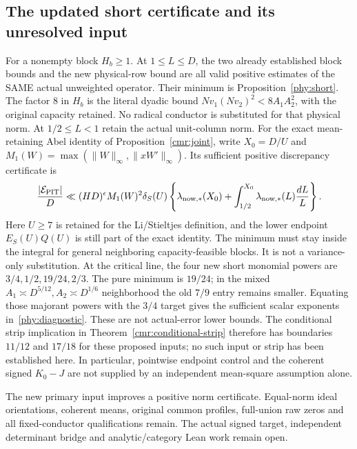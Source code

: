 \subsection{The updated short certificate and its unresolved input}\label{phy:short-proof}
For a nonempty block $H_b\ge1$. At $1\le L\le D$, the two already established block bounds and the new
physical-row bound are all valid positive estimates of the SAME actual
unweighted operator. Their minimum is Proposition~\ref{phy:short}.
The factor $8$ in $H_b$ is the literal dyadic bound
$Nv_1(Nv_2)^2<8A_1A_2^2$, with the original capacity retained.
No radical conductor is substituted for that physical norm.
At $1/2\le L<1$ retain the actual unit-column norm.
For the exact mean-retaining Abel identity of Proposition~\ref{cmr:joint},
write $X_0=D/U$ and $M_1(W)=\max(\|W\|_\infty,\|xW'\|_\infty)$.
Its sufficient positive discrepancy certificate is
\[
 \frac{|\mathcal E_{\rm PIT}|}{D}
 \ll (HD)^\epsilon M_1(W)^2\delta_S(U)
 \left\{\lambda_{{\rm now},*}(X_0)
       +\int_{1/2}^{X_0}\lambda_{{\rm now},*}(L)\frac{dL}{L}\right\}.
\]
Here $U\ge7$ is retained for the Li/Stieltjes definition, and the lower
endpoint $E_S(U)Q(U)$ is still part of the exact identity.
The minimum must stay inside the integral for general neighboring
capacity-feasible blocks. It is not a variance-only substitution.
At the critical line, the four new short monomial powers are
$3/4,1/2,19/24,2/3$. The pure minimum is $19/24$; in the mixed
$A_1\asymp D^{5/12},A_2\asymp D^{1/6}$ neighborhood the old $7/9$
entry remains smaller. Equating those majorant powers with the $3/4$
target gives the sufficient scalar exponents in~\eqref{phy:diagnostic}.
These are not actual-error lower bounds.
The conditional strip implication in Theorem~\ref{cmr:conditional-strip}
therefore has boundaries $11/12$ and $17/18$ for these proposed inputs;
no such input or strip has been established here. In particular,
pointwise endpoint control and the coherent signed $K_0-J$ are not
supplied by an independent mean-square assumption alone.

The new primary input improves a positive norm certificate. Equal-norm
ideal orientations, coherent means, original common profiles, full-union
raw zeros and all fixed-conductor qualifications remain. The actual
signed target, independent determinant bridge and analytic/category
Lean work remain open.

